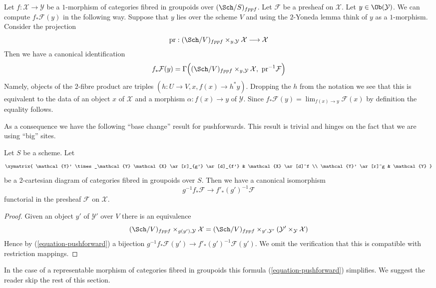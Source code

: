 \noindent
Let $f : \mathcal{X} \to \mathcal{Y}$ be a $1$-morphism of categories
fibred in groupoids over $(\Sch/S)_{fppf}$. Let $\mathcal{F}$
be a presheaf on $\mathcal{X}$. Let $y \in \Ob(\mathcal{Y})$.
We can compute $f_*\mathcal{F}(y)$ in the following way. Suppose that
$y$ lies over the scheme $V$ and using the $2$-Yoneda lemma think
of $y$ as a $1$-morphism. Consider the projection
$$
\text{pr} :
(\Sch/V)_{fppf} \times_{y, \mathcal{Y}} \mathcal{X}
\longrightarrow
\mathcal{X}
$$
Then we have a canonical identification
\begin{equation}
\label{equation-pushforward}
f_*\mathcal{F}(y) = \Gamma\Big(
(\Sch/V)_{fppf} \times_{y, \mathcal{Y}} \mathcal{X},
\ \text{pr}^{-1}\mathcal{F}\Big)
\end{equation}
Namely, objects of the $2$-fibre product are triples
$(h : U \to V, x, f(x) \to h^*y)$. Dropping the $h$ from the
notation we see that this is equivalent to the data of an object
$x$ of $\mathcal{X}$ and a morphism $\alpha : f(x) \to y$ of $\mathcal{Y}$.
Since $f_*\mathcal{F}(y) = \lim_{f(x) \to y} \mathcal{F}(x)$ by definition
the equality follows.

\medskip\noindent
As a consequence we have the following ``base change'' result for
pushforwards. This result is trivial and hinges on the fact that
we are using ``big'' sites.

\begin{lemma}
\label{lemma-base-change}
Let $S$ be a scheme. Let
$$
\xymatrix{
\mathcal{Y}' \times_\mathcal{Y} \mathcal{X} \ar[r]_{g'} \ar[d]_{f'} &
\mathcal{X} \ar[d]^f \\
\mathcal{Y}' \ar[r]^g & \mathcal{Y}
}
$$
be a $2$-cartesian diagram of categories fibred in groupoids over $S$.
Then we have a canonical isomorphism
$$
g^{-1}f_*\mathcal{F} \longrightarrow f'_*(g')^{-1}\mathcal{F}
$$
functorial in the presheaf $\mathcal{F}$ on $\mathcal{X}$.
\end{lemma}

\begin{proof}
Given an object $y'$ of $\mathcal{Y}'$ over $V$
there is an equivalence
$$
(\Sch/V)_{fppf} \times_{g(y'), \mathcal{Y}} \mathcal{X}
=
(\Sch/V)_{fppf} \times_{y', \mathcal{Y}'}
(\mathcal{Y}' \times_\mathcal{Y} \mathcal{X})
$$
Hence by (\ref{equation-pushforward}) a bijection
$g^{-1}f_*\mathcal{F}(y') \to f'_*(g')^{-1}\mathcal{F}(y')$.
We omit the verification that this is compatible with restriction
mappings.
\end{proof}

\noindent
In the case of a representable morphism of categories fibred in groupoids
this formula (\ref{equation-pushforward}) simplifies. We suggest the
reader skip the rest of this section.

